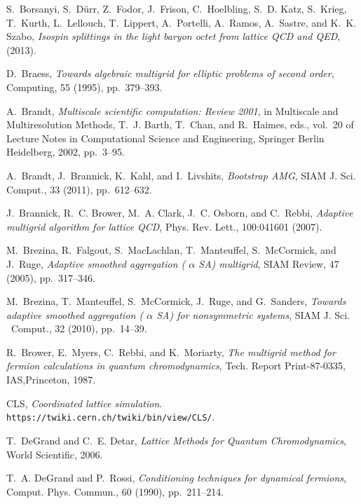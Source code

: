 \documentclass{siamltex}
\begin{document}
\begin{thebibliography}{10}
  {\sc S.~Borsanyi, S.~D{\"{u}}rr, Z.~Fodor, J.~Frison, C.~Hoelbling, S.~D. Katz,
  S.~Krieg, T.~Kurth, L.~Lellouch, T.~Lippert, A.~Portelli, A.~Ramos,
  A.~Sastre, and K.~K. Szabo}, {\em Isospin splittings in the light baryon
      octet from lattice {QCD} and {QED}},  (2013).

  {\sc D.~Braess}, {\em Towards algebraic multigrid for elliptic problems of
      second order}, {Computing}, {55} ({1995}), pp.~379--393.

  {\sc A.~Brandt}, {\em Multiscale scientific computation: Review 2001}, in
  Multiscale and Multiresolution Methods, T.~J. Barth, T.~Chan, and R.~Haimes,
  eds., vol.~20 of Lecture Notes in Computational Science and Engineering,
  Springer Berlin Heidelberg, 2002, pp.~3--95.

  {\sc A.~Brandt, J.~Brannick, K.~Kahl, and I.~Livshits}, {\em Bootstrap {AMG}},
  SIAM J. Sci. Comput., 33 (2011), pp.~612--632.

  {\sc J.~Brannick, R.~C. Brower, M.~A. Clark, J.~C. Osborn, and C.~Rebbi}, {\em
      Adaptive multigrid algorithm for lattice {QCD}}, Phys. Rev. Lett., 100:041601
  (2007).

  {\sc M.~Brezina, R.~Falgout, S.~MacLachlan, T.~Manteuffel, S.~McCormick, and
    J.~Ruge}, {\em Adaptive smoothed aggregation {(        $\alpha$        SA)} multigrid}, SIAM
  Review, 47 (2005), pp.~317--346.

  {\sc M.~Brezina, T.~Manteuffel, S.~McCormick, J.~Ruge, and G.~Sanders}, {\em
      Towards adaptive smoothed aggregation {(        $\alpha$        SA)} for nonsymmetric
      systems}, SIAM J. Sci. \  Comput., 32 (2010), pp.~14--39.

  {\sc R.~Brower, E.~Myers, C.~Rebbi, and K.~Moriarty}, {\em The multigrid method
      for fermion calculations in quantum chromodynamics}, Tech. Report
  Print-87-0335, IAS,Princeton, 1987.

  {\sc CLS}, {\em Coordinated lattice simulation}.
  \newblock \texttt{https://twiki.cern.ch/twiki/bin/view/CLS/}.

  {\sc T.~DeGrand and C.~E. Detar}, {\em Lattice Methods for Quantum
      Chromodynamics}, World Scientific, 2006.

  {\sc T.~A. DeGrand and P.~Rossi}, {\em Conditioning techniques for dynamical
      fermions}, Comput. Phys. Commun., 60 (1990), pp.~211--214.


\end{thebibliography}
\end{document}
